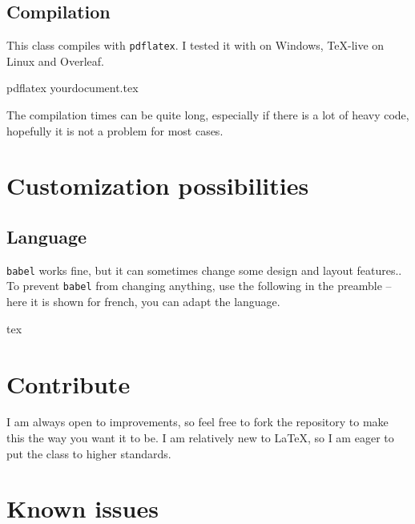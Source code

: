 \documentclass[
	raggedright,
	12pt,
	colorful,
]{tufte-style-article}
\begin{document}
\subsection{Compilation}

This class compiles with \texttt{pdflatex}. I tested it with  on Windows, \TeX-live on Linux and Overleaf.
\begin{codebox}{}
pdflatex yourdocument.tex
\end{codebox}
The compilation times can be quite long, especially if there is a lot of heavy code, hopefully it is not a problem for most cases.


\section{Customization possibilities}
\label{sec:customization-possibilities}

\subsection{Language}

\texttt{babel} works fine, but it can sometimes change some design and layout features.. To prevent \texttt{babel} from changing anything, use the following in the preamble --here it is shown for french, you can adapt the language.
\begin{codebox}{tex}
\end{codebox}


\section{Contribute}
\label{sec:contribute}

I am always open to improvements, so feel free to fork the repository to make this the way you want it to be. I am relatively new to \LaTeX{}, so I am eager to put the class to higher standards.


\section{Known issues}
\label{sec:known-issues}
\end{document}
